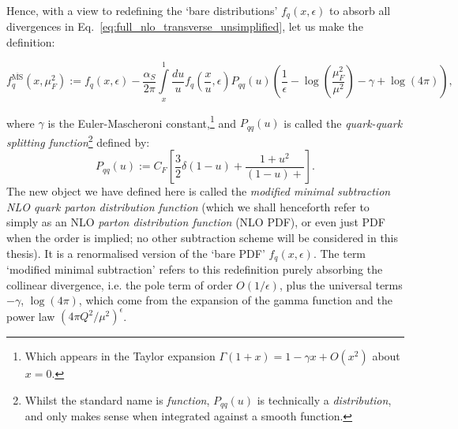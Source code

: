 \documentclass[withindex,glossary]{cam-thesis}
\begin{document}
Hence, with a view to redefining the `bare distributions' $f_q(x,\epsilon)$ to absorb all divergences in Eq.~\eqref{eq:full_nlo_transverse_unsimplified}, let us make the definition:
\begin{framed}
\begin{equation}
\label{eq:pdf_definition}
f_q^{\overline{\text{MS}}}(x, \mu_F^2) := f_q(x,\epsilon) - \frac{\alpha_S}{2\pi} \int\limits_{x}^{1} \frac{du}{u} f_q\left( \frac{x}{u},\epsilon\right) P_{qq}(u) \left( \frac{1}{\epsilon} - \log\left( \frac{\mu_F^2}{\mu^2} \right) - \gamma + \log(4\pi) \right),
\end{equation}
\end{framed}
\noindent where $\gamma$ is the Euler-Mascheroni constant,\footnote{Which appears in the Taylor expansion $\Gamma(1+x) = 1 - \gamma x + O(x^2)$ about $x=0$.} and $P_{qq}(u)$ is called the \textit{quark-quark splitting function}\footnote{Whilst the standard name is \textit{function}, $P_{qq}(u)$ is technically a \textit{distribution}, and only makes sense when integrated against a smooth function.} defined by:
\begin{equation}
P_{qq}(u) := C_F \left[ \frac{3}{2} \delta(1-u) + \frac{1+u^2}{(1-u)+} \right].
\end{equation} 
\noindent The new object we have defined here is called the \textit{modified minimal subtraction NLO quark parton distribution function} (which we shall henceforth refer to simply as an NLO \textit{parton distribution function} (NLO PDF), or even just PDF when the order is implied; no other subtraction scheme will be considered in this thesis). It is a renormalised version of the `bare PDF' $f_q(x,\epsilon)$. The term `modified minimal subtraction' refers to this redefinition purely absorbing the collinear divergence, i.e. the pole term of order $O(1/\epsilon)$, plus the universal terms $-\gamma$, $\log(4\pi)$, which come from the expansion of the gamma function and the power law $(4\pi Q^2/\mu^2)^{\epsilon}$.
\end{document}
